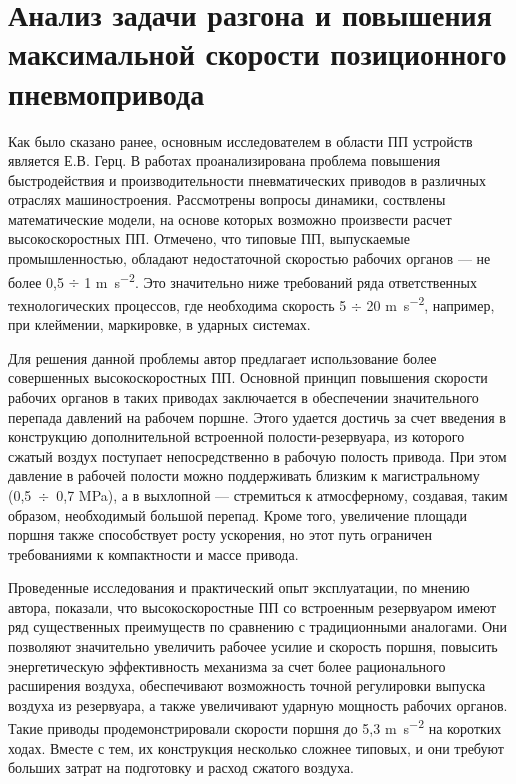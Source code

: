 \section{Анализ задачи разгона и повышения максимальной скорости позиционного пневмопривода}\label{sec:ch1/sec3}

Как было сказано ранее, основным исследователем в области ПП устройств является Е.В. Герц. В работах
\cite*{герц:скоростной_привод,герц:групповой_привод}
проанализирована проблема повышения быстродействия и производительности пневматических приводов
в различных отраслях машиностроения. Рассмотрены вопросы динамики, соствлены математические модели, на основе которых
возможно произвести расчет высокоскоростных ПП. Отмечено, что типовые ПП, выпускаемые промышленностью,
обладают недостаточной скоростью рабочих органов --- не более 0,5 $\div$ 1 \si{\metre\per\square\second}. Это значительно ниже
требований ряда ответственных технологических процессов, где необходима скорость 5  $\div$ 20 \si{\metre\per\square\second},
например, при клеймении, маркировке, в ударных системах.

Для решения данной проблемы автор предлагает использование более совершенных высокоскоростных
ПП. Основной принцип повышения скорости рабочих органов в таких приводах
заключается в обеспечении значительного перепада давлений на рабочем поршне. Этого удается достичь
за счет введения в конструкцию дополнительной встроенной полости-резервуара, из которого сжатый воздух
поступает непосредственно в рабочую полость привода. При этом давление в рабочей полости
можно поддерживать близким к магистральному (0,5~$\div$~0,7 \si{\mega\pascal}), а в выхлопной --- стремиться к атмосферному,
создавая, таким образом, необходимый большой перепад. Кроме того, увеличение площади поршня также
способствует росту ускорения, но этот путь ограничен требованиями к компактности и массе привода.

Проведенные исследования и практический опыт эксплуатации, по мнению автора, показали, что
высокоскоростные ПП со встроенным резервуаром имеют ряд существенных преимуществ
по сравнению с традиционными аналогами. Они позволяют значительно увеличить рабочее усилие и
скорость поршня, повысить энергетическую эффективность механизма за счет более рационального
расширения воздуха, обеспечивают возможность точной регулировки выпуска воздуха из резервуара,
а также увеличивают ударную мощность рабочих органов. Такие приводы продемонстрировали скорости
поршня до 5,3 \si{\metre\per\square\second} на коротких ходах. Вместе с тем, их конструкция несколько сложнее типовых,
и они требуют больших затрат на подготовку и расход сжатого воздуха.

